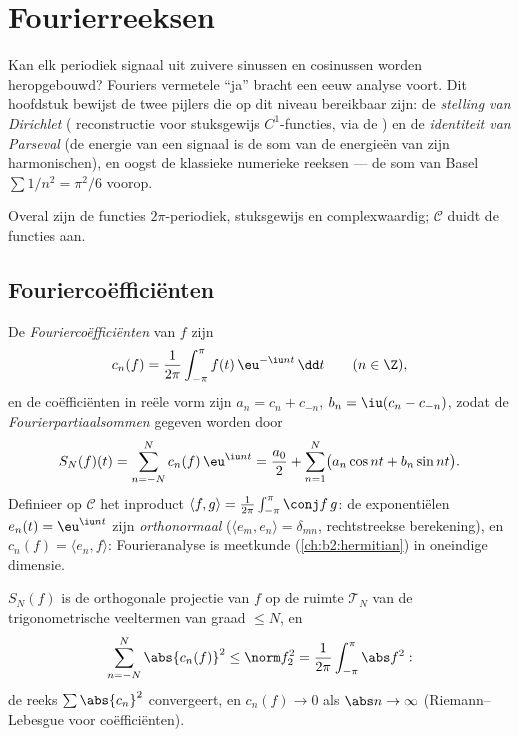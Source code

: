 \chapter{Fourierreeksen}\label{ch:b2:fourier}

Kan elk periodiek signaal uit zuivere sinussen en cosinussen worden
heropgebouwd? Fouriers vermetele ``ja'' bracht een eeuw analyse
voort. Dit hoofdstuk bewijst de twee pijlers die op dit niveau
bereikbaar zijn: de \emph{stelling van Dirichlet} (
reconstructie voor stuksgewijs $C^1$-functies, via de
) en de \emph{identiteit van Parseval} (de energie
van een signaal is de som van de energieën van zijn harmonischen),
en oogst de klassieke numerieke reeksen --- de som van Basel $\sum
1/n^2 = \pi^2/6$ voorop.

Overal zijn de functies $2\pi$-periodiek, stuksgewijs  en
complexwaardig; $\mathcal{C}$ duidt de  functies aan.

\section{Fouriercoëfficiënten}

\begin{definition}\label{def:b2:fourier:coefficients}
De \emph{Fouriercoëfficiënten} van $f$
zijn
\[
c_n(f) = \frac{1}{2\pi}\int_{-\pi}^{\pi} f(t)\,\eu^{-\iu n t}\,\dd
t \qquad (n \in \Z),
\]
en de coëfficiënten in reële vorm zijn $a_n = c_n + c_{-n}$, $b_n =
\iu(c_n - c_{-n})$, zodat de
\emph{Fourierpartiaalsommen} gegeven
worden door
\[
S_N(f)(t) = \sum_{n=-N}^{N} c_n(f)\,\eu^{\iu nt}
= \frac{a_0}{2} + \sum_{n=1}^{N}\bigl(a_n\cos nt + b_n \sin
nt\bigr).
\]
Definieer op $\mathcal{C}$ het  inproduct $\langle f,
g\rangle = \frac{1}{2\pi}\int_{-\pi}^{\pi}\conj f\,g$: de
exponentiëlen $e_n(t) = \eu^{\iu nt}$ zijn \emph{orthonormaal}
($\langle e_m, e_n\rangle = \delta_{mn}$, rechtstreekse
berekening), en $c_n(f) = \langle e_n, f\rangle$: Fourieranalyse is
 meetkunde (\cref{ch:b2:hermitian}) in oneindige
dimensie.
\end{definition}

\begin{proposition}\label{prop:b2:fourier:bessel}
$S_N(f)$ is de orthogonale projectie van $f$ op de ruimte
$\mathcal{T}_N$ van de trigonometrische veeltermen van graad $\leq
N$, en
\[
\sum_{n=-N}^{N} \abs{c_n(f)}^2 \leq \norm f_2^2 =
\frac{1}{2\pi}\int_{-\pi}^{\pi} \abs f^2 :
\]
de reeks $\sum \abs{c_n}^2$ convergeert, en $c_n(f) \to 0$ als
$\abs n \to \infty$ (Riemann--Lebesgue voor coëfficiënten).
\end{proposition}

